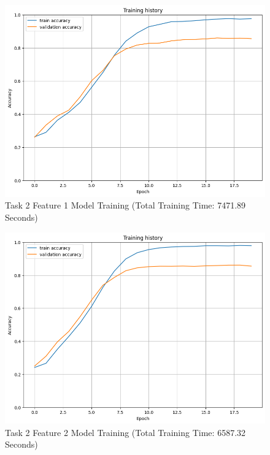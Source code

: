 \documentclass[10.7pt, onecolumn]{article}
\begin{document}
\begin{figure}[H]
  \centering
  \includegraphics[]{images/model2_task2_feature1_plot.png}
  \caption{Task 2 Feature 1 Model Training (Total Training Time: 7471.89 Seconds)}
  \label{fig:t2f1plot}
\end{figure}

\begin{figure}[H]
  \centering
  \includegraphics[]{images/model2_task2_feature2_plot.png}
  \caption{Task 2 Feature 2 Model Training (Total Training Time: 6587.32 Seconds)}
  \label{fig:t2f2plot}
\end{figure}
\end{document}
